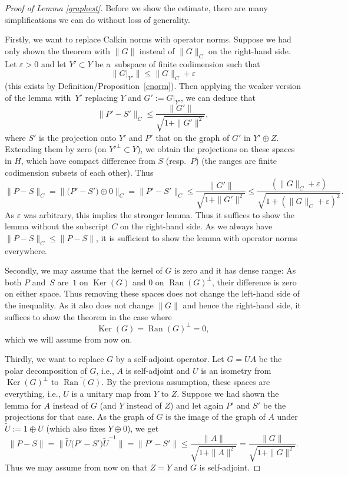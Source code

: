 \documentclass[10pt,a4paper]{amsart}
\numberwithin{equation}{section}
\DeclareMathOperator{\Ran}{Ran}
\DeclareMathOperator{\Ker}{Ker}
\begin{document}
	\begin{proof}[Proof of Lemma \ref{graphest}]
		Before we show the estimate, there are many simplifications we can do without loss of generality.

		Firstly, we want to replace Calkin norms with operator norms. Suppose we had only shown the theorem with $\|G\|$ instead of $\|G\|_C$ on the right-hand side. Let $\varepsilon >0$ and let $Y'\subset Y$ be a~subspace of finite codimension such that
		\[\|G|_{Y'}\|\leq\|G\|_C+\varepsilon\]
		(this exists by Definition/Proposition~\ref{cnorm}). Then applying the weaker version of the lemma with~$Y'$ replacing $Y$ and $G':=G|_{Y'}$, we can deduce that
		\[\bigl\|P'-S'\bigr\|_C\leq \frac{\|G'\|}{\sqrt{1+\|G'\|^2}},\]
		where $S'$ is the projection onto $Y'$ and $P'$ that on the graph of $G'$ in $Y'\oplus Z$. Extending them by zero \big(on $Y'^\bot\subset Y$\big), we obtain the projections on these spaces in $H$, which have compact difference from $S$ (resp.\ $P$) (the ranges are finite codimension subsets of each other).
		Thus
		\[\|P-S\|_C=\bigl\|\bigl(P'-S'\bigr)\oplus 0\bigr\|_C=\bigl\|P'-S'\bigr\|_C\leq \frac{\|G'\|}{\sqrt{1+\|G'\|^2}}\leq \frac{(\|G\|_C+\varepsilon)}{\sqrt{1+(\|G\|_C+\varepsilon)^2}}.\]
		As $\varepsilon$ was arbitrary, this implies the stronger lemma. Thus it suffices to show the lemma without the subscript $C$ on the right-hand side. As we always have $\|P-S\|_C\leq \|P-S\|$, it is sufficient to show the lemma with operator norms everywhere.
		
		Secondly, we may assume that the kernel of $G$ is zero and it has dense range: As both $P$ and~$S$ are~$1$ on $\Ker(G)$ and $0$ on $\Ran(G)^\bot$, their difference is zero on either space. Thus removing these spaces does not change the left-hand side of the inequality. As it also does not change $\|G\|$ and hence the right-hand side, it suffices to show the theorem in the case where
\[
\Ker(G)=\Ran(G)^\bot=0,
\]
		which we will assume from now on.

		Thirdly, we want to replace $G$ by a self-adjoint operator. Let $G=UA$ be the polar decomposition of $G$, i.e., $A$ is self-adjoint and $U$ is an isometry from $\Ker(G)^\bot$ to $\overline{\Ran(G)}$. By the previous assumption, these spaces are everything, i.e., $U$ is a unitary map from $Y$ to $Z$. Suppose we had shown the lemma for $A$ instead of $G$ (and $Y$ instead of $Z$) and let again $P'$ and $S'$ be the projections for that case. As the graph of $G$ is the image of the graph of $A$ under $\tilde U:=1\oplus U$ (which also fixes $Y\oplus 0$), we get
		\[
        \|P-S\|=\bigl\|\tilde U\bigl(P'-S'\bigr)\tilde U^{-1}\bigr\|=\bigl\|P'-S'\bigr\|\leq \frac{\|A\|}{\sqrt{1+\|A\|^2}}=\frac{\|G\|}{\sqrt{1+\|G\|^2}}.
        \]
		Thus we may assume from now on that $Z=Y$ and $G$ is self-adjoint.


\end{proof}
\end{document}
